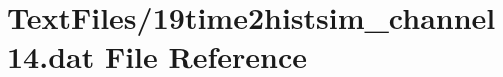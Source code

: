 \hypertarget{19time2histsim__channel14_8dat}{}\section{Text\+Files/19time2histsim\+\_\+channel14.dat File Reference}
\label{19time2histsim__channel14_8dat}

